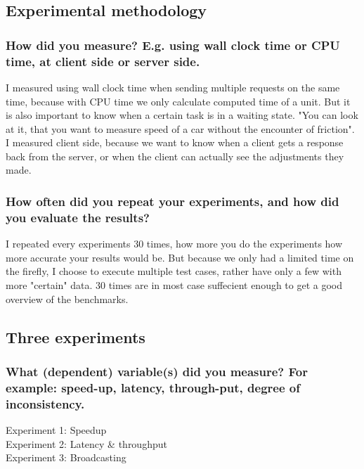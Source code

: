 \documentclass[a4paper]{article}
\begin{document}
\subsection{Experimental methodology}
\subsubsection{How did you measure? E.g. using wall clock time or CPU time, at client side or 
		server side.}
I measured using wall clock time when sending multiple requests on the same time, because with CPU time we only calculate computed time of a unit. But it is also important to know when a certain task is in a waiting state. "You can look at it, that you want to measure speed of a car without the encounter of friction".  %
I measured client side, because we want to know when a client gets a response back from the server, or when the client can actually see the adjustments they made.
\subsubsection{How often did you repeat your experiments, and how did you evaluate the results?}
I repeated every experiments 30 times, how more you do the experiments how more accurate your results would be. But because we only had a limited time on the firefly, I choose to execute multiple test cases, rather have only a few with more "certain" data. 30 times are in most case suffecient enough to get a good overview of the benchmarks. 

\subsection{Three experiments}
\subsubsection{What (dependent) variable(s) did you measure? For example: speed-up, latency, 
		through-put, degree of inconsistency.}
		Experiment 1: Speedup \\
		Experiment 2: Latency \& throughput \\
		Experiment 3: Broadcasting \\
\end{document}
